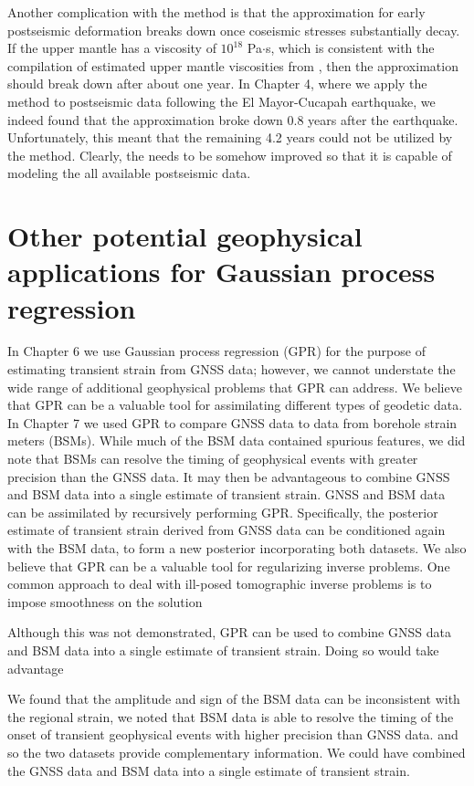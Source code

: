 Another complication with the \citet{Hines2016} method is that the approximation for early postseismic deformation breaks down once coseismic stresses substantially decay. If the upper mantle has a viscosity of $10^{18}$ Pa$\cdot$s, which is consistent with the compilation of estimated upper mantle viscosities from \citep{Thatcher2008}, then the approximation should break down after about one year. In Chapter 4, where we apply the \citet{Hines2016} method to postseismic data following the El Mayor-Cucapah earthquake, we indeed found that the approximation broke down 0.8 years after the earthquake. Unfortunately, this meant that the remaining 4.2 years could not be utilized by the \citet{Hines2016} method. Clearly, the \citet{Hines2016} needs to be somehow improved so that it is capable of modeling the all available postseismic data.             

\section{Other potential geophysical applications for Gaussian process regression}
In Chapter 6 we use Gaussian process regression (GPR) for the purpose of estimating transient strain from GNSS data; however, we cannot understate the wide range of additional geophysical problems that GPR can address. We believe that GPR can be a valuable tool for assimilating different types of geodetic data. In Chapter 7 we used GPR to compare GNSS data to data from borehole strain meters (BSMs). While much of the BSM data contained spurious features, we did note that BSMs can resolve the timing of geophysical events with greater precision than the GNSS data. It may then be advantageous to combine GNSS and BSM data into a single estimate of transient strain. GNSS and BSM data can be assimilated by recursively performing GPR. Specifically, the posterior estimate of transient strain derived from GNSS data can be conditioned again with the BSM data, to form a new posterior incorporating both datasets. We also believe that GPR can be a valuable tool for regularizing inverse problems. One common approach to deal with ill-posed tomographic inverse problems is to impose smoothness on the solution \cite{Aster2011}  

Although this was not demonstrated, GPR can be used to combine GNSS data and BSM data into a single estimate of transient strain. Doing so would take advantage   

We found that the amplitude and sign of the BSM data can be inconsistent with the regional strain, we noted that BSM data is able to resolve the timing of the onset of transient geophysical events with higher precision than GNSS data. and so the two datasets provide complementary information. We could have combined the GNSS data and BSM data into a single estimate of transient strain.           


  


